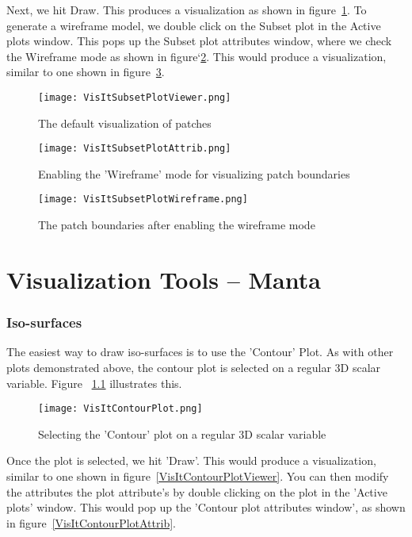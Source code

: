 Next, we hit Draw. This produces a visualization as shown in figure~\ref{VisItSubsetPlotViewer}. To generate a wireframe model, we double click on the Subset plot in the Active plots window. This pops up the Subset plot attributes window, where we check the Wireframe mode as shown in figure`\ref{VisItSubsetPlotAttrib}. This would produce a visualization, similar to one shown in figure~\ref{VisItSubsetPlotWireframe}.

\begin{figure}
  \center
  \texttt{[image: VisItSubsetPlotViewer.png]}
  \caption{The default visualization of patches} 
  \label{VisItSubsetPlotViewer}
\end{figure}

\begin{figure}
  \center
  \texttt{[image: VisItSubsetPlotAttrib.png]}
  \caption{Enabling the 'Wireframe' mode for visualizing patch boundaries}
  \label{VisItSubsetPlotAttrib}
\end{figure}

\begin{figure}
  \center
  \texttt{[image: VisItSubsetPlotWireframe.png]}
  \caption{The patch boundaries after enabling the wireframe mode}
  \label{VisItSubsetPlotWireframe}
\end{figure}


\chapter{Visualization Tools -- Manta}

\subsection{Iso-surfaces}

The easiest way to draw iso-surfaces is to use the 'Contour' Plot. As with other plots demonstrated above, the contour plot is selected on a regular 3D scalar variable. Figure ~\ref{VisItContourPlot} illustrates this. 

\begin{figure}
  \center
  \texttt{[image: VisItContourPlot.png]}
  \caption{Selecting the 'Contour' plot on a regular 3D scalar variable}
  \label{VisItContourPlot}
\end{figure}

Once the plot is selected, we hit 'Draw'. This would produce a visualization, similar to one shown in figure~\ref{VisItContourPlotViewer}. You can then modify the attributes the plot attribute's by double clicking on the plot in the 'Active plots' window. This would pop up the 'Contour plot attributes window', as shown in figure~\ref{VisItContourPlotAttrib}. 

